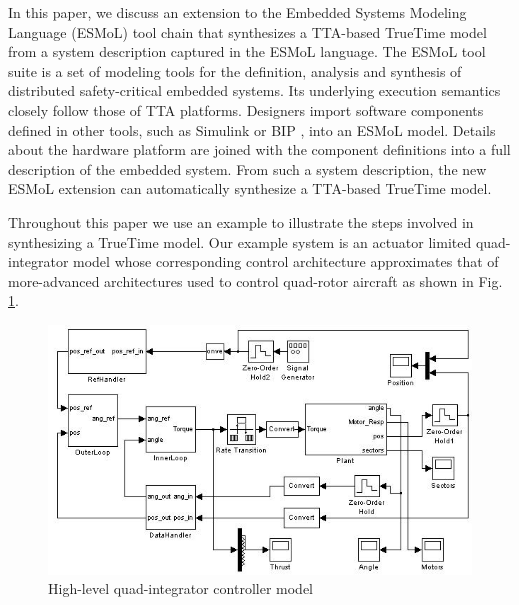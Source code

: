 In this paper, we discuss an extension to the Embedded Systems Modeling Language (ESMoL) \cite{pkvnhhts_08, pvknks_09, thibodeaux_08}  tool chain that synthesizes a TTA-based TrueTime model from a system description captured in the ESMoL language.  The ESMoL tool suite is a set of modeling tools for the definition, analysis and synthesis of distributed safety-critical embedded systems.  Its underlying execution semantics closely follow those of TTA platforms.  Designers import software components defined in other tools, such as Simulink or BIP \cite{basu_08, bbs_06}, into an ESMoL model.  Details about the hardware platform are joined with the component definitions into a full description of the embedded system.  From such a system description, the new ESMoL extension can automatically synthesize a TTA-based TrueTime model.

Throughout this paper we use an example to illustrate the steps involved in synthesizing a TrueTime model.  Our example system is an actuator limited quad-integrator model whose corresponding control architecture approximates that of more-advanced architectures used to control quad-rotor aircraft \cite{kp_08} as shown in Fig. \ref{fig:quad_integrator_model}.  
\begin{figure}[ht]
\centering
\includegraphics[width=\columnwidth]{figures/quad_integrator.jpg}
    \caption{High-level quad-integrator controller model}
    \label{fig:quad_integrator_model}
\end{figure}

